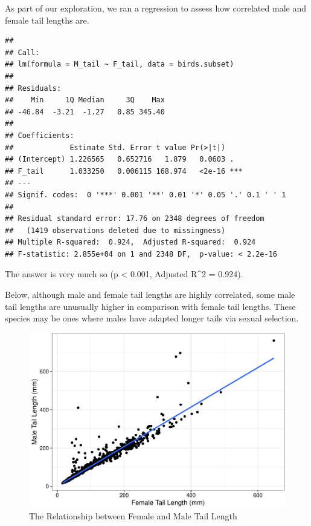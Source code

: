 \documentclass[
  12pt,
]{article}
\begin{document}
\newpage

As part of our exploration, we ran a regression to assess how correlated
male and female tail lengths are.

\begin{verbatim}
## 
## Call:
## lm(formula = M_tail ~ F_tail, data = birds.subset)
## 
## Residuals:
##    Min     1Q Median     3Q    Max 
## -46.84  -3.21  -1.27   0.85 345.40 
## 
## Coefficients:
##             Estimate Std. Error t value Pr(>|t|)    
## (Intercept) 1.226565   0.652716   1.879   0.0603 .  
## F_tail      1.033250   0.006115 168.974   <2e-16 ***
## ---
## Signif. codes:  0 '***' 0.001 '**' 0.01 '*' 0.05 '.' 0.1 ' ' 1
## 
## Residual standard error: 17.76 on 2348 degrees of freedom
##   (1419 observations deleted due to missingness)
## Multiple R-squared:  0.924,  Adjusted R-squared:  0.924 
## F-statistic: 2.855e+04 on 1 and 2348 DF,  p-value: < 2.2e-16
\end{verbatim}

The answer is very much so (p \textless{} 0.001, Adjusted R\^{}2 =
0.924).

\newpage

Below, although male and female tail lengths are highly correlated, some
male tail lengths are unusually higher in comparison with female tail
lengths. These species may be ones where males have adapted longer tails
via sexual selection.

\begin{figure}
\centering
\includegraphics{Project_Code_files/figure-latex/r exploratory_plots_3-1.pdf}
\caption{The Relationship between Female and Male Tail Length}
\end{figure}
\end{document}
